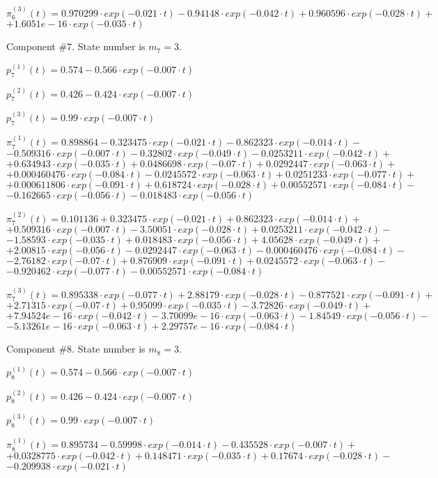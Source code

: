 $\pi^{(3)}_6(t)=0.970299\cdot exp(-0.021\cdot t)-0.94148\cdot exp(-0.042\cdot t)+0.960596\cdot exp(-0.028\cdot t)+$
$+1.6051e-16\cdot exp(-0.035\cdot t)$

 Component #$7$. State number is $m_7=3$.

 $p^{(1)}_7(t)=0.574-0.566\cdot exp(-0.007\cdot t)$

 $p^{(2)}_7(t)=0.426-0.424\cdot exp(-0.007\cdot t)$

 $p^{(3)}_7(t)=0.99\cdot exp(-0.007\cdot t)$

 $\pi^{(1)}_7(t)=0.898864-0.323475\cdot exp(-0.021\cdot t)-0.862323\cdot exp(-0.014\cdot t)-$
$-0.509316\cdot exp(-0.007\cdot t)-0.32802\cdot exp(-0.049\cdot t)-0.0253211\cdot exp(-0.042\cdot t)+$
$+0.634943\cdot exp(-0.035\cdot t)+0.0486698\cdot exp(-0.07\cdot t)+0.0292447\cdot exp(-0.063\cdot t)+$
$+0.000460476\cdot exp(-0.084\cdot t)-0.0245572\cdot exp(-0.063\cdot t)+0.0251233\cdot exp(-0.077\cdot t)+$
$+0.000611806\cdot exp(-0.091\cdot t)+0.618724\cdot exp(-0.028\cdot t)+0.00552571\cdot exp(-0.084\cdot t)-$
$-0.162665\cdot exp(-0.056\cdot t)-0.018483\cdot exp(-0.056\cdot t)$

 $\pi^{(2)}_7(t)=0.101136+0.323475\cdot exp(-0.021\cdot t)+0.862323\cdot exp(-0.014\cdot t)+$
$+0.509316\cdot exp(-0.007\cdot t)-3.50051\cdot exp(-0.028\cdot t)+0.0253211\cdot exp(-0.042\cdot t)-$
$-1.58593\cdot exp(-0.035\cdot t)+0.018483\cdot exp(-0.056\cdot t)+4.05628\cdot exp(-0.049\cdot t)+$
$+2.00815\cdot exp(-0.056\cdot t)-0.0292447\cdot exp(-0.063\cdot t)-0.000460476\cdot exp(-0.084\cdot t)-$
$-2.76182\cdot exp(-0.07\cdot t)+0.876909\cdot exp(-0.091\cdot t)+0.0245572\cdot exp(-0.063\cdot t)-$
$-0.920462\cdot exp(-0.077\cdot t)-0.00552571\cdot exp(-0.084\cdot t)$

 $\pi^{(3)}_7(t)=0.895338\cdot exp(-0.077\cdot t)+2.88179\cdot exp(-0.028\cdot t)-0.877521\cdot exp(-0.091\cdot t)+$
$+2.71315\cdot exp(-0.07\cdot t)+0.95099\cdot exp(-0.035\cdot t)-3.72826\cdot exp(-0.049\cdot t)+$
$+7.94524e-16\cdot exp(-0.042\cdot t)-3.70099e-16\cdot exp(-0.063\cdot t)-1.84549\cdot exp(-0.056\cdot t)-$
$-5.13261e-16\cdot exp(-0.063\cdot t)+2.29757e-16\cdot exp(-0.084\cdot t)$

 Component #$8$. State number is $m_8=3$.

 $p^{(1)}_8(t)=0.574-0.566\cdot exp(-0.007\cdot t)$

 $p^{(2)}_8(t)=0.426-0.424\cdot exp(-0.007\cdot t)$

 $p^{(3)}_8(t)=0.99\cdot exp(-0.007\cdot t)$

 $\pi^{(1)}_8(t)=0.895734-0.59998\cdot exp(-0.014\cdot t)-0.435528\cdot exp(-0.007\cdot t)+$
$+0.0328775\cdot exp(-0.042\cdot t)+0.148471\cdot exp(-0.035\cdot t)+0.17674\cdot exp(-0.028\cdot t)-$
$-0.209938\cdot exp(-0.021\cdot t)$

